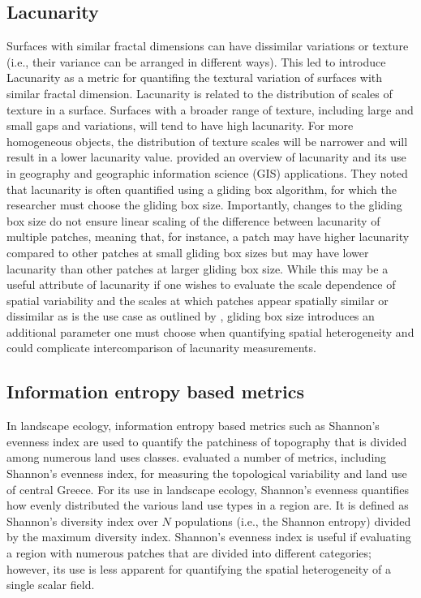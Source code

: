 \subsection{Lacunarity}
Surfaces with similar fractal dimensions can have dissimilar variations or texture (i.e., their variance can be arranged in different ways). This led \textcite{mandelbrot_fractal_1983} to introduce Lacunarity as a metric for quantifing the textural variation of surfaces with similar fractal dimension. Lacunarity is related to the distribution of scales of texture in a surface. Surfaces with a broader range of texture, including large and small gaps and variations, will tend to have high lacunarity. For more homogeneous objects, the distribution of texture scales will be narrower and will result in a lower lacunarity value. \textcite{dong_lacunarity_2000} provided an overview of lacunarity and its use in geography and geographic information science (GIS) applications. They noted that lacunarity is often quantified using a gliding box algorithm, for which the researcher must choose the gliding box size. Importantly, changes to the gliding box size do not ensure linear scaling of the difference between lacunarity of multiple patches, meaning that, for instance, a patch may have higher lacunarity compared to other patches at small gliding box sizes but may have lower lacunarity than other patches at larger gliding box size. While this may be a useful attribute of lacunarity if one wishes to evaluate the scale dependence of spatial variability and the scales at which patches appear spatially similar or dissimilar as is the use case as outlined by \textcite{dong_lacunarity_2000}, gliding box size introduces an additional parameter one must choose when quantifying spatial heterogeneity and could complicate intercomparison of lacunarity measurements.

\subsection{Information entropy based metrics}
In landscape ecology, information entropy based metrics such as Shannon’s evenness index are used to quantify the patchiness of topography that is divided among numerous land uses classes. \textcite{plexida_selecting_2014} evaluated a number of metrics, including Shannon’s evenness index, for measuring the topological variability and land use of central Greece. For its use in landscape ecology, Shannon’s evenness quantifies how evenly distributed the various land use types in a region are. It is defined as Shannon’s diversity index over $N$ populations (i.e., the Shannon entropy) divided by the maximum diversity index. Shannon's evenness index is useful if evaluating a region with numerous patches that are divided into different categories; however, its use is less apparent for quantifying the spatial heterogeneity of a single scalar field.

